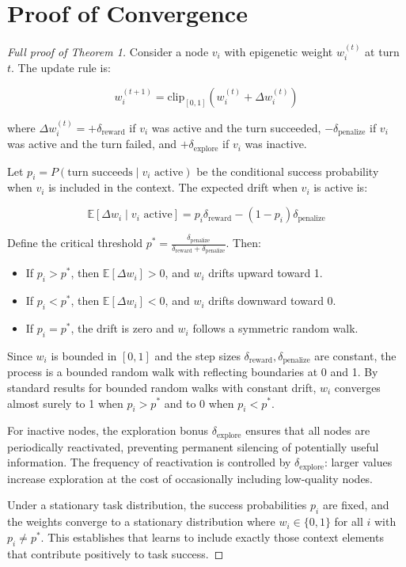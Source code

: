 \section{Proof of Convergence}
\label{sec:proof}

\begin{proof}[Full proof of Theorem 1]
Consider a node $v_i$ with epigenetic weight $w_i^{(t)}$ at turn $t$. The update rule is:

\begin{equation}
    w_i^{(t+1)} = \text{clip}_{[0,1]}\left(w_i^{(t)} + \Delta w_i^{(t)}\right)
\end{equation}

where $\Delta w_i^{(t)} = +\delta_{\text{reward}}$ if $v_i$ was active and the turn succeeded, $-\delta_{\text{penalize}}$ if $v_i$ was active and the turn failed, and $+\delta_{\text{explore}}$ if $v_i$ was inactive.

Let $p_i = P(\text{turn succeeds} \mid v_i \text{ active})$ be the conditional success probability when $v_i$ is included in the context. The expected drift when $v_i$ is active is:

\begin{equation}
    \mathbb{E}[\Delta w_i \mid v_i \text{ active}] = p_i \delta_{\text{reward}} - (1-p_i) \delta_{\text{penalize}}
\end{equation}

Define the critical threshold $p^* = \frac{\delta_{\text{penalize}}}{\delta_{\text{reward}} + \delta_{\text{penalize}}}$. Then:

\begin{itemize}
    \item If $p_i > p^*$, then $\mathbb{E}[\Delta w_i] > 0$, and $w_i$ drifts upward toward 1.
    \item If $p_i < p^*$, then $\mathbb{E}[\Delta w_i] < 0$, and $w_i$ drifts downward toward 0.
    \item If $p_i = p^*$, the drift is zero and $w_i$ follows a symmetric random walk.
\end{itemize}

Since $w_i$ is bounded in $[0,1]$ and the step sizes $\delta_{\text{reward}}, \delta_{\text{penalize}}$ are constant, the process is a bounded random walk with reflecting boundaries at 0 and 1. By standard results for bounded random walks with constant drift, $w_i$ converges almost surely to 1 when $p_i > p^*$ and to 0 when $p_i < p^*$.

For inactive nodes, the exploration bonus $\delta_{\text{explore}}$ ensures that all nodes are periodically reactivated, preventing permanent silencing of potentially useful information. The frequency of reactivation is controlled by $\delta_{\text{explore}}$: larger values increase exploration at the cost of occasionally including low-quality nodes.

Under a stationary task distribution, the success probabilities $p_i$ are fixed, and the weights converge to a stationary distribution where $w_i \in \{0, 1\}$ for all $i$ with $p_i \neq p^*$. This establishes that \EpiContext{} learns to include exactly those context elements that contribute positively to task success.
\end{proof}

